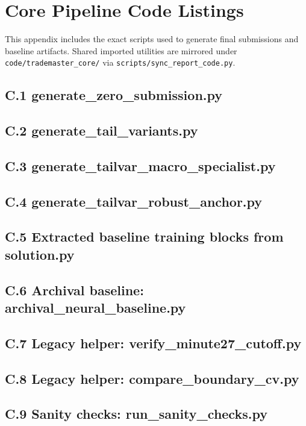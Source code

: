 \section{Core Pipeline Code Listings}

This appendix includes the exact scripts used to generate final submissions and baseline artifacts. Shared imported utilities are mirrored under \texttt{code/trademaster\_core/} via \texttt{scripts/sync\_report\_code.py}.

\subsection*{C.1 generate\_zero\_submission.py}


\subsection*{C.2 generate\_tail\_variants.py}


\subsection*{C.3 generate\_tailvar\_macro\_specialist.py}


\subsection*{C.4 generate\_tailvar\_robust\_anchor.py}


\subsection*{C.5 Extracted baseline training blocks from solution.py}


\subsection*{C.6 Archival baseline: archival\_neural\_baseline.py}


\subsection*{C.7 Legacy helper: verify\_minute27\_cutoff.py}


\subsection*{C.8 Legacy helper: compare\_boundary\_cv.py}


\subsection*{C.9 Sanity checks: run\_sanity\_checks.py}

